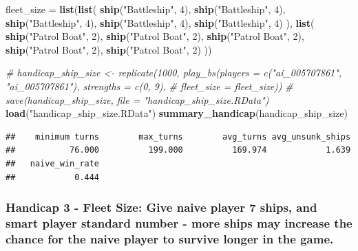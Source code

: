 \documentclass[
]{article}
\newenvironment{Shaded}{\begin{snugshade}}{\end{snugshade}}
\newcommand{\CommentTok}[1]{\textcolor[rgb]{0.56,0.35,0.01}{\textit{#1}}}
\newcommand{\DecValTok}[1]{\textcolor[rgb]{0.00,0.00,0.81}{#1}}
\newcommand{\FunctionTok}[1]{\textcolor[rgb]{0.13,0.29,0.53}{\textbf{#1}}}
\newcommand{\NormalTok}[1]{#1}
\newcommand{\OtherTok}[1]{\textcolor[rgb]{0.56,0.35,0.01}{#1}}
\newcommand{\StringTok}[1]{\textcolor[rgb]{0.31,0.60,0.02}{#1}}
\begin{document}
\begin{Shaded}
\begin{Highlighting}[]
\NormalTok{fleet\_size }\OtherTok{=} \FunctionTok{list}\NormalTok{(}\FunctionTok{list}\NormalTok{(}
  \FunctionTok{ship}\NormalTok{(}\StringTok{"Battleship"}\NormalTok{, }\DecValTok{4}\NormalTok{),}
  \FunctionTok{ship}\NormalTok{(}\StringTok{"Battleship"}\NormalTok{, }\DecValTok{4}\NormalTok{),}
  \FunctionTok{ship}\NormalTok{(}\StringTok{"Battleship"}\NormalTok{, }\DecValTok{4}\NormalTok{),}
  \FunctionTok{ship}\NormalTok{(}\StringTok{"Battleship"}\NormalTok{, }\DecValTok{4}\NormalTok{),}
  \FunctionTok{ship}\NormalTok{(}\StringTok{"Battleship"}\NormalTok{, }\DecValTok{4}\NormalTok{)}
\NormalTok{),}
\FunctionTok{list}\NormalTok{(}
  \FunctionTok{ship}\NormalTok{(}\StringTok{"Patrol Boat"}\NormalTok{, }\DecValTok{2}\NormalTok{),}
  \FunctionTok{ship}\NormalTok{(}\StringTok{"Patrol Boat"}\NormalTok{, }\DecValTok{2}\NormalTok{),}
  \FunctionTok{ship}\NormalTok{(}\StringTok{"Patrol Boat"}\NormalTok{, }\DecValTok{2}\NormalTok{),}
  \FunctionTok{ship}\NormalTok{(}\StringTok{"Patrol Boat"}\NormalTok{, }\DecValTok{2}\NormalTok{),}
  \FunctionTok{ship}\NormalTok{(}\StringTok{"Patrol Boat"}\NormalTok{, }\DecValTok{2}\NormalTok{)}
\NormalTok{))}
  
\CommentTok{\# handicap\_ship\_size \textless{}{-} replicate(1000, play\_bs(players = c("ai\_005707861", "ai\_005707861"), strengths = c(0, 9),}
\CommentTok{\#         fleet\_size = fleet\_size))}
\CommentTok{\# save(handicap\_ship\_size, file = "handicap\_ship\_size.RData")}
\FunctionTok{load}\NormalTok{(}\StringTok{"handicap\_ship\_size.RData"}\NormalTok{)}
\FunctionTok{summary\_handicap}\NormalTok{(handicap\_ship\_size)}
\end{Highlighting}
\end{Shaded}

\begin{verbatim}
##    minimum turns        max_turns        avg_turns avg_unsunk_ships 
##           76.000          199.000          169.974            1.639 
##   naive_win_rate 
##            0.444
\end{verbatim}

\subsubsection{Handicap 3 - Fleet Size: Give naive player 7 ships, and
smart player standard number - more ships may increase the chance for
the naive player to survive longer in the
game.}\label{handicap-3---fleet-size-give-naive-player-7-ships-and-smart-player-standard-number---more-ships-may-increase-the-chance-for-the-naive-player-to-survive-longer-in-the-game.}
\end{document}

